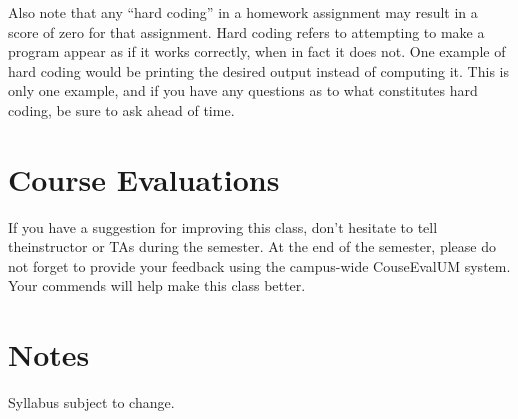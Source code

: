 \documentclass[12pt]{article}
\begin{document}
Also note that any ``hard coding'' in a homework assignment may result in a score of zero for that assignment. Hard coding refers to attempting to make a program appear as if it works correctly, when in fact it does not. One example of hard coding would be printing the desired output instead of computing it. This is only one example, and if you have any questions as to what constitutes hard coding, be sure to ask ahead of time.

\section*{Course Evaluations}
If you have a suggestion for improving this class, don't hesitate to tell theinstructor or TAs during the semester.
At the end of the semester, please do not forget to provide your feedback using the campus-wide CouseEvalUM system. Your commends will help make this class better.

\section*{Notes}
Syllabus subject to change.
\end{document}
